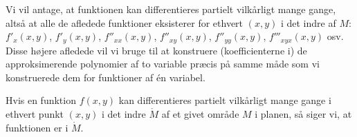 Vi vil antage, at funktionen kan differentieres partielt vilkårligt mange gange, altså at alle de afledede funktioner eksisterer for ethvert $(x,y)$ i det indre af $M$: $f'_{x}(x, y)$, $f'_{y}(x, y)$, $f''_{xx}(x, y)$, $f''_{xy}(x, y)$, $f''_{yy}(x, y)$, $f'''_{xyx}(x,y)$ osv. Disse højere afledede vil vi bruge til at konstruere (koefficienterne i) de approksimerende polynomier  af to variable præcis på samme måde som vi konstruerede dem for funktioner af \'{e}n variabel.

\begin{definition}
Hvis en funktion $f(x,y)$  kan differentieres partielt  vilkårligt mange gange i ethvert punkt $(x,y)$ i det indre $\mathring{M}$ af et givet område $M$ i planen, så siger vi, at funktionen er  i $\mathring{M}$.
\end{definition}


